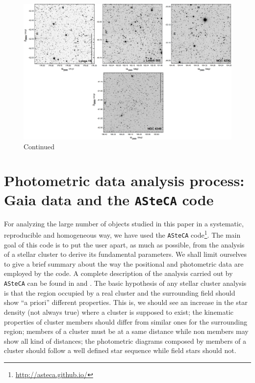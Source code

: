 \documentclass[draft]{aa}
\begin{document}
\begin{figure}[htp]
    \addtocounter{figure}{-1}
    \centering
    \includegraphics[width=1\hsize]{../figs/frames_1.png}
    \caption{Continued}
    \label{fig:Vim2}
\end{figure}





\section{Photometric data analysis process: Gaia data and the \texttt{ASteCA}
code}
\label{sec:photom_analysis}

For analyzing the large number of objects studied in this paper in a
systematic, reproducible and homogeneous way, we have used the \texttt{ASteCA}
code\footnote{\url{http://asteca.github.io/}}. The main goal of this code is to
put the user apart, as much as possible, from the analysis of a stellar cluster
to derive its fundamental parameters. We shall limit ourselves to give a brief
summary about the way the positional and photometric data are employed by the
code. A complete description of the analysis carried out by
\texttt{ASteCA} can be found in \cite{Perren_2015} and \cite{Perren_2017}.
%
The basic hypothesis of any stellar cluster analysis is that the
region occupied by a real cluster and the surrounding field should show ``a
priori'' different properties.
This is, we should see an increase in the star density  (not always true) where
a cluster is supposed to exist; the kinematic properties of cluster members
should differ from similar ones for the surrounding region; members of a
cluster must be at a same distance while non members may show all kind of
distances; the photometric diagrams composed by members of a cluster should
follow a well defined star sequence while field stars should not. 
\end{document}
